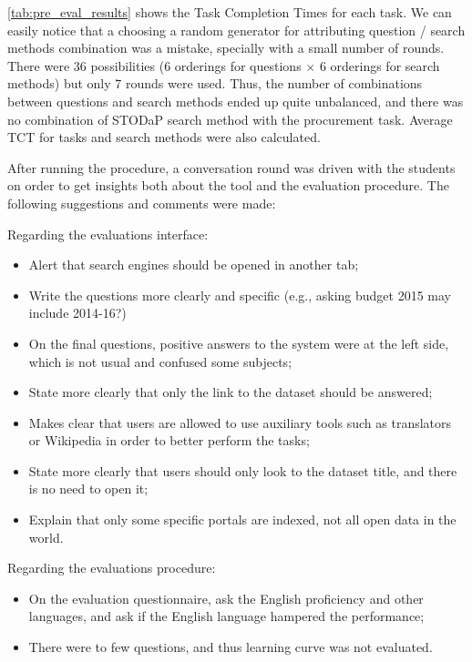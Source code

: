 \autoref{tab:pre_eval_results} shows the Task Completion Times for each task.
We can easily notice that a choosing a random generator for attributing question / search methods combination was a mistake, specially with a small number of rounds.
There were 36 possibilities (6 orderings for questions $\times$ 6 orderings for search methods) but only 7 rounds were used.
Thus, the number of combinations between questions and search methods ended up quite unbalanced, and there was no combination of STODaP search method with the procurement task.
Average TCT for tasks and search methods were also calculated.

After running the procedure, a conversation round was driven with the students on order to get insights both about the tool and the evaluation procedure.
The following suggestions and comments were made:

Regarding the evaluations interface:

\begin{itemize}
	\item Alert that search engines should be opened in another tab;
	\item Write the questions more clearly and specific (e.g., asking budget 2015 may include 2014-16?)
	\item On the final questions, positive answers to the system were at the left side, which is not usual and confused some subjects;
	\item State more clearly that only the link to the dataset should be answered;
	\item Makes clear that users are allowed to use auxiliary tools such as translators or Wikipedia in order to better perform the tasks;
	\item State more clearly that users should only look to the dataset title, and there is no need to open it;
	\item Explain that only some specific portals are indexed, not all open data in the world.
\end{itemize}

Regarding the evaluations procedure:
\begin{itemize}
	\item On the evaluation questionnaire, ask the English proficiency and other languages, and ask if the English language hampered the performance;
	\item There were to few questions, and thus learning curve was not evaluated.
\end{itemize}
	
